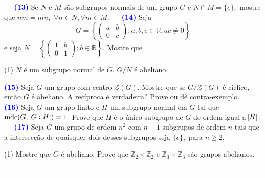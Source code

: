 \documentclass[12pt, a4paper]{article}
\newcommand{\mdc}{{\rm mdc}}
\newcommand{\negrito}[1]{\mbox{\boldmath{$#1$}}}
\begin{document}
\textcolor{white}{Oi}\newline\newline
\textcolor{blue}{\bf(13)}\label{51}  Se  $N$ e $M$ são subgrupos normais de um grupo $G$ e $N \cap M = \{e\},$ mostre que $nm = mn,$ $\forall n \in N, \forall m \in M.$
\textcolor{white}{Oi}\newline\newline
\textcolor{blue}{\bf(14)}\label{52} Seja 
\[
G = \left\{ \left(\begin{array}{cc} a & b \\ 0 & c \end{array}\right): a,b,c \in \mathbb{R}, ac \neq 0 \right\}
\]
e seja $N = \left\{ \left(\begin{array}{cc} 1 & b \\ 0 & 1 \end{array}\right) : b \in \mathbb{R} \right\}.$ Mostre que
\begin{tasks}[counter-format={(tsk[a])},label-width=3.6ex, label-format = {\bfseries}, column-sep = {0pt}](1)
\task[\textcolor{Floresta}{$\negrito{(a)} $}] $N$ é um subgrupo normal de $G.$
\task[\textcolor{Floresta}{$\negrito{(b)} $}] $G/N$ é abeliano.
\end{tasks}
\textcolor{blue}{\bf(15)}\label{53} Seja $G$ um grupo com centro $\mathcal{Z}(G).$ Mostre que se $G/\mathcal{Z}(G)$ é cíclico, então $G$ é abeliano. A recíproca é verdadeira? Prove ou dê contra-exemplo.
\textcolor{white}{Oi}\newline\newline
\textcolor{blue}{\bf(16)}\label{54} Seja $G$ um grupo finito e $H$ um subgrupo normal em $G$ tal que $\mdc(G, [G:H]) = 1.$ Prove que $H$ é o único subgrupo de $G$ de ordem igual a $\abs{H}.$ 
\textcolor{white}{Oi}\newline\newline
\textcolor{blue}{\bf(17)}\label{55} Seja $G$ um grupo de ordem $n^2$ com $n+1$ subgrupos de ordem $n$ tais que a intersecção de quaisquer dois desses subgrupos seja $\{e \},$ para $n \ge 2.$ 
\begin{tasks}[counter-format={(tsk[a])},label-width=3.6ex, label-format = {\bfseries}, column-sep = {0pt}](1)
\task[\textcolor{Floresta}{$\negrito{(a)} $}] Mostre que $G$ é abeliano.
\task[\textcolor{Floresta}{$\negrito{(b)} $}] Prove que $\mathbb{Z}_2 \times \mathbb{Z}_2$ e $\mathbb{Z}_3 \times \mathbb{Z}_3$ são grupos abelianos.
\end{tasks}
\textcolor{white}{Oi}\newline\newline
\end{document}
